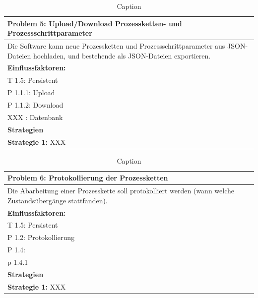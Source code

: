 \documentclass[enabledeprecatedfontcommands,fontsize=12pt,paper=a4,twoside]{scrartcl}
\begin{document}
\begin{table}[H]
    \centering
    \begin{tabular}{|p{15cm}|}
    \hline
          \textbf{Problem 5:} Upload/Download Prozessketten- und Prozessschrittparameter \\ \hline
          Die Software kann neue Prozessketten und Prozessschrittparameter aus JSON-Dateien hochladen, und bestehende als JSON-Dateien exportieren.
          \\ \hline
          \textbf{Einflussfaktoren: } \\
          T 1.5: Persistent \\
          P 1.1.1: Upload\\
          P 1.1.2: Download\\
          XXX : Datenbank \\
          \hline
          \textbf{Strategien} \\ \hline
          \textbf{Strategie 1:} XXX
          \\ \hline
    \end{tabular}

    \caption{Caption}
    \label{tab:my_label}
\end{table}

\begin{table}[H]
    \centering
    \begin{tabular}{|p{15cm}|}
    \hline
          \textbf{Problem 6:} Protokollierung der Prozessketten
          \\ \hline
          Die Abarbeitung einer Prozesskette soll protokolliert werden (wann welche Zustandsübergänge stattfanden).
          \\ \hline
          \textbf{Einflussfaktoren: } \\
          T 1.5: Persistent \\
          P 1.2: Protokollierung\\
          P 1.4:\\
          p 1.4.1\\
          \hline
          \textbf{Strategien} \\ \hline
          \textbf{Strategie 1:} XXX
          \\ \hline
    \end{tabular}

    \caption{Caption}
    \label{tab:my_label}
\end{table}
\end{document}
